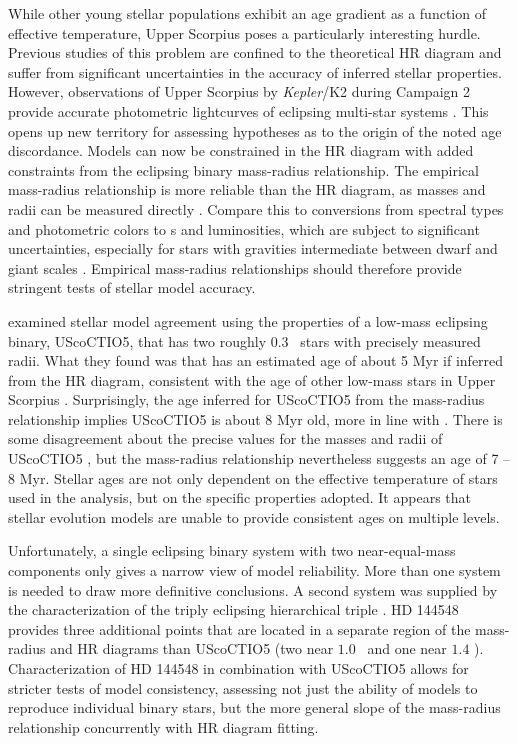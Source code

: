 \documentclass{aa}
\begin{document}
While other young stellar populations exhibit an age gradient as a function of effective temperature, Upper Scorpius poses a particularly interesting hurdle. Previous studies of this problem are confined to the theoretical HR diagram and suffer from significant uncertainties in the accuracy of inferred stellar properties. However, observations of Upper Scorpius by \emph{Kepler}/K2 during Campaign 2 provide accurate photometric lightcurves of eclipsing multi-star systems \citep{Kraus2015, Alonso2015, David2016, Lodieu2015}. This opens up new territory for assessing hypotheses as to the origin of the noted age discordance. Models can now be constrained in the HR diagram with added constraints from the eclipsing binary mass-radius relationship. The empirical mass-radius relationship is more reliable than the HR diagram, as masses and radii can be measured directly \citep[e.g.,][]{Andersen1991,Torres2010}. Compare this to conversions from spectral types and photometric colors to \teff s and luminosities, which are subject to significant uncertainties, especially for stars with gravities intermediate between dwarf and giant scales \citep[see, e.g.,][]{Pecaut2013}. Empirical mass-radius relationships should therefore provide stringent tests of stellar model accuracy.

\citet{Kraus2015} examined stellar model agreement using the properties of a low-mass eclipsing binary, UScoCTIO5, that has two roughly 0.3 \msun\ stars with precisely measured radii. What they found was that  has an estimated age of about 5 Myr if inferred from the HR diagram, consistent with the age of other low-mass stars in Upper Scorpius \citep{Preibisch2002, Slesnick2008}. Surprisingly, the age inferred for UScoCTIO5 from the mass-radius relationship implies UScoCTIO5 is about 8 Myr old, more in line with \citet{Pecaut2012}. There is some disagreement about the precise values for the masses and radii of UScoCTIO5 \citep{David2016}, but the mass-radius relationship nevertheless suggests an age of 7 -- 8 Myr. Stellar ages are not only dependent on the effective temperature of stars used in the analysis, but on the specific properties adopted. It appears that stellar evolution models are unable to provide consistent ages on multiple levels.

Unfortunately, a single eclipsing binary system with two near-equal-mass components only gives a narrow view of model reliability. More than one system is needed to draw more definitive conclusions. A second system was supplied by the characterization of the triply eclipsing hierarchical triple  \citep{Alonso2015}. HD 144548 provides three additional points that are located in a separate region of the mass-radius and HR diagrams than UScoCTIO5 (two near $1.0$ \msun\ and one near $1.4$ \msun). Characterization of HD 144548 in combination with UScoCTIO5 allows for stricter tests of model consistency, assessing not just the ability of models to reproduce individual binary stars, but the more general slope of the mass-radius relationship concurrently with HR diagram fitting.
\end{document}

